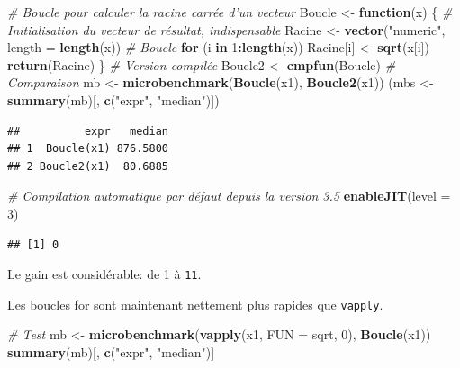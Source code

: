 \documentclass[
  12pt,
  french,
  a4paper,
  extrafontsizes,onecolumn,openright
  ]{memoir}
\newenvironment{Shaded}{\begin{snugshade}}{\end{snugshade}}
\newcommand{\CommentTok}[1]{\textcolor[rgb]{0.56,0.35,0.01}{\textit{#1}}}
\newcommand{\ControlFlowTok}[1]{\textcolor[rgb]{0.13,0.29,0.53}{\textbf{#1}}}
\newcommand{\DataTypeTok}[1]{\textcolor[rgb]{0.13,0.29,0.53}{#1}}
\newcommand{\DecValTok}[1]{\textcolor[rgb]{0.00,0.00,0.81}{#1}}
\newcommand{\KeywordTok}[1]{\textcolor[rgb]{0.13,0.29,0.53}{\textbf{#1}}}
\newcommand{\NormalTok}[1]{#1}
\newcommand{\OperatorTok}[1]{\textcolor[rgb]{0.81,0.36,0.00}{\textbf{#1}}}
\newcommand{\StringTok}[1]{\textcolor[rgb]{0.31,0.60,0.02}{#1}}
\begin{document}
\begin{Shaded}
\begin{Highlighting}[]
\CommentTok{# Boucle pour calculer la racine carrée d'un vecteur}
\NormalTok{Boucle <-}\StringTok{ }\ControlFlowTok{function}\NormalTok{(x) \{}
    \CommentTok{# Initialisation du vecteur de résultat, indispensable}
\NormalTok{    Racine <-}\StringTok{ }\KeywordTok{vector}\NormalTok{(}\StringTok{"numeric"}\NormalTok{, }\DataTypeTok{length =} \KeywordTok{length}\NormalTok{(x))}
    \CommentTok{# Boucle}
    \ControlFlowTok{for}\NormalTok{ (i }\ControlFlowTok{in} \DecValTok{1}\OperatorTok{:}\KeywordTok{length}\NormalTok{(x)) Racine[i] <-}\StringTok{ }\KeywordTok{sqrt}\NormalTok{(x[i])}
    \KeywordTok{return}\NormalTok{(Racine)}
\NormalTok{\}}
\CommentTok{# Version compilée}
\NormalTok{Boucle2 <-}\StringTok{ }\KeywordTok{cmpfun}\NormalTok{(Boucle)}
\CommentTok{# Comparaison}
\NormalTok{mb <-}\StringTok{ }\KeywordTok{microbenchmark}\NormalTok{(}\KeywordTok{Boucle}\NormalTok{(x1), }\KeywordTok{Boucle2}\NormalTok{(x1))}
\NormalTok{(mbs <-}\StringTok{ }\KeywordTok{summary}\NormalTok{(mb)[, }\KeywordTok{c}\NormalTok{(}\StringTok{"expr"}\NormalTok{, }\StringTok{"median"}\NormalTok{)])}
\end{Highlighting}
\end{Shaded}

\begin{verbatim}
##          expr   median
## 1  Boucle(x1) 876.5800
## 2 Boucle2(x1)  80.6885
\end{verbatim}

\begin{Shaded}
\begin{Highlighting}[]
\CommentTok{# Compilation automatique par défaut depuis la version 3.5}
\KeywordTok{enableJIT}\NormalTok{(}\DataTypeTok{level =} \DecValTok{3}\NormalTok{)}
\end{Highlighting}
\end{Shaded}

\begin{verbatim}
## [1] 0
\end{verbatim}

\normalsize
Le gain est considérable: de 1 à \texttt{11}.

Les boucles for sont maintenant nettement plus rapides que \texttt{vapply}.

\scriptsize

\begin{Shaded}
\begin{Highlighting}[]
\CommentTok{# Test}
\NormalTok{mb <-}\StringTok{ }\KeywordTok{microbenchmark}\NormalTok{(}\KeywordTok{vapply}\NormalTok{(x1, }\DataTypeTok{FUN =}\NormalTok{ sqrt, }\DecValTok{0}\NormalTok{), }\KeywordTok{Boucle}\NormalTok{(x1))}
\KeywordTok{summary}\NormalTok{(mb)[, }\KeywordTok{c}\NormalTok{(}\StringTok{"expr"}\NormalTok{, }\StringTok{"median"}\NormalTok{)]}
\end{Highlighting}
\end{Shaded}
\end{document}
